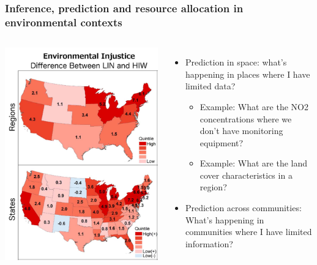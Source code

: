 \documentclass[mathserif, aspectratio=169]{beamer}
\begin{document}
\begin{frame}
	\frametitle{Inference, prediction and resource allocation in environmental contexts}
	\begin{columns}[c]
			\includegraphics[width = \textwidth]{marshall_injustice}
			\begin{itemize}
				\item Prediction in space: what's happening in places where I have limited data?
				\begin{itemize}
					\item Example: What are the NO2 concentrations where we don't have monitoring equipment?
					\item Example: What are the land cover characteristics in a region?
				\end{itemize}
				\item Prediction across communities: What's happening in communities where I have limited information?  

\end{itemize}
\end{columns}
\end{frame}
\end{document}
